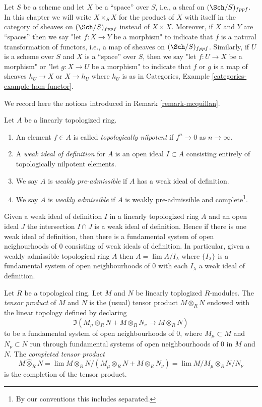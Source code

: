 \medskip\noindent
Let $S$ be a scheme and let $X$ be a ``space'' over $S$, i.e., a sheaf on
$(\Sch/S)_{fppf}$. In this chapter we will write $X \times_S X$ for the
product of $X$ with itself in the category of sheaves on $(\Sch/S)_{fppf}$
instead of $X \times X$. Moreover, if $X$ and $Y$ are ``spaces'' then
we say "let $f : X \to Y$ be a morphism" to indicate that $f$ is a
natural transformation of functors, i.e., a map of sheaves on
$(\Sch/S)_{fppf}$. Similarly, if $U$ is a scheme over $S$ and
$X$ is a ``space'' over $S$, then we say
"let $f : U \to X$ be a morphism" or
"let $g : X \to U$ be a morphism" to indicate that $f$ or $g$
is a map of sheaves $h_U \to X$ or $X \to h_U$ where $h_U$ is as in
Categories, Example \ref{categories-example-hom-functor}.

\medskip\noindent
We record here the notions introduced in Remark \ref{remark-mcquillan}.

\begin{definition}
\label{definition-weakly-admissible}
Let $A$ be a linearly topologized ring.
\begin{enumerate}
\item An element $f \in A$ is called {\it topologically nilpotent}
if $f^n \to 0$ as $n \to \infty$.
\item A {\it weak ideal of definition} for $A$ is an open ideal
$I \subset A$ consisting entirely of topologically nilpotent elements.
\item We say $A$ is {\it weakly pre-admissible} if $A$ has a weak
ideal of definition.
\item We say $A$ is {\it weakly admissible} if $A$ is weakly pre-admissible
and complete\footnote{By our conventions this includes separated.}.
\end{enumerate}
\end{definition}

\noindent
Given a weak ideal of definition $I$ in a linearly topologized ring
$A$ and an open ideal $J$ the intersection $I \cap J$ is a
weak ideal of definition. Hence if there is one weak ideal of definition,
then there is a fundamental system of open neighourhoods of $0$
consisting of weak ideals of definition. In particular,
given a weakly admissible topological ring $A$ then
$A = \lim A/I_\lambda$ where $\{I_\lambda\}$ is a fundamental system
of open neighbourhoods of $0$ with each $I_\lambda$ a weak ideal of definition.

\begin{definition}
\label{definition-toplogy-tensor-product}
Let $R$ be a topological ring. Let $M$ and $N$ be linearly
toplogized $R$-modules. The {\it tensor product} of $M$ and $N$
is the (usual) tensor product $M \otimes_R N$ endowed
with the linear topology defined by declaring
$$
\Im(M_\mu \otimes_R N + M \otimes_R N_\nu \longrightarrow M \otimes_R N)
$$
to be a fundamental system of open neighbourhoods of $0$, where
$M_\mu \subset M$ and $N_\nu \subset N$ run through fundamental
systems of open neighbourhoods of $0$ in $M$ and $N$.
The {\it completed tensor product}
$$
M \widehat\otimes_R N =
\lim M \otimes_R N/(M_\mu \otimes_R N + M \otimes_R N_\nu) =
\lim M/M_\mu \otimes_R N/N_\nu
$$
is the completion of the tensor product.
\end{definition}

